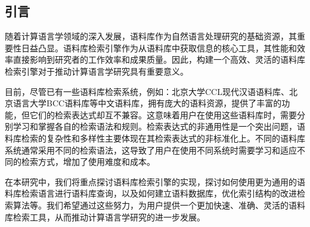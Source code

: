 \documentclass[11pt]{article}
\begin{document}
\begin{CJK*}{UTF8}{gbsn}
\section{引言}
\label{intro}

随着计算语言学领域的深入发展，语料库作为自然语言处理研究的基础资源，其重要性日益凸显。语料库检索引擎作为从语料库中获取信息的核心工具，其性能和效率直接影响到研究者的工作效率和成果质量。因此，构建一个高效、灵活的语料库检索引擎对于推动计算语言学研究具有重要意义。

目前，尽管已有一些语料库检索系统，例如：北京大学CCL现代汉语语料库、北京语言大学BCC语料库等中文语料库，拥有庞大的语料资源，提供了丰富的功能，但它们的检索表达式却互不兼容。这意味着用户在使用这些语料库时，需要分别学习和掌握各自的检索语法和规则。检索表达式的非通用性是一个突出问题，语料库检索的复杂性和多样性主要体现在其检索表达式的非标准化上。不同的语料库系统通常采用不同的检索语法，这导致了用户在使用不同系统时需要学习和适应不同的检索方式，增加了使用难度和成本。



在本研究中，我们将重点探讨语料库检索引擎的实现，探讨如何使用更为通用的语料库检索语言进行语料库查询，以及如何建立语料数据库，优化索引结构的改进检索算法等。我们希望通过这些努力，为用户提供一个更加快速、准确、灵活的语料库检索工具，从而推动计算语言学研究的进一步发展。
%
%
%
%
%

%
%
\end{CJK*}
\end{document}
